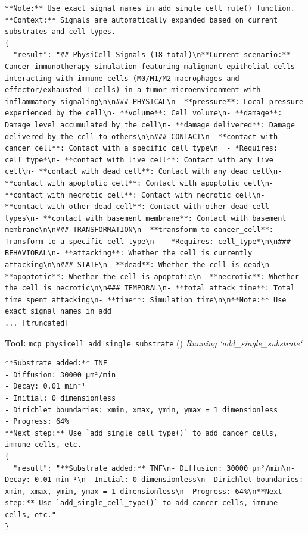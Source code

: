 \documentclass[11pt,a4paper]{article}
\begin{document}
\begin{toolokbox}
\begin{lstlisting}
**Note:** Use exact signal names in add_single_cell_rule() function.
**Context:** Signals are automatically expanded based on current substrates and cell types.
{
  "result": "## PhysiCell Signals (18 total)\n**Current scenario:** Cancer immunotherapy simulation featuring malignant epithelial cells interacting with immune cells (M0/M1/M2 macrophages and effector/exhausted T cells) in a tumor microenvironment with inflammatory signaling\n\n### PHYSICAL\n- **pressure**: Local pressure experienced by the cell\n- **volume**: Cell volume\n- **damage**: Damage level accumulated by the cell\n- **damage delivered**: Damage delivered by the cell to others\n\n### CONTACT\n- **contact with cancer_cell**: Contact with a specific cell type\n  - *Requires: cell_type*\n- **contact with live cell**: Contact with any live cell\n- **contact with dead cell**: Contact with any dead cell\n- **contact with apoptotic cell**: Contact with apoptotic cell\n- **contact with necrotic cell**: Contact with necrotic cell\n- **contact with other dead cell**: Contact with other dead cell types\n- **contact with basement membrane**: Contact with basement membrane\n\n### TRANSFORMATION\n- **transform to cancer_cell**: Transform to a specific cell type\n  - *Requires: cell_type*\n\n### BEHAVIORAL\n- **attacking**: Whether the cell is currently attacking\n\n### STATE\n- **dead**: Whether the cell is dead\n- **apoptotic**: Whether the cell is apoptotic\n- **necrotic**: Whether the cell is necrotic\n\n### TEMPORAL\n- **total attack time**: Total time spent attacking\n- **time**: Simulation time\n\n**Note:** Use exact signal names in add
... [truncated]
\end{lstlisting}
\end{toolokbox}
\begin{toolokbox}
\textbf{Tool:} \texttt{mcp\_physicell\_add\_single\_substrate} (\checkmark)
\textit{Running `add\_single\_substrate`}
\begin{lstlisting}
**Substrate added:** TNF
- Diffusion: 30000 μm²/min
- Decay: 0.01 min⁻¹
- Initial: 0 dimensionless
- Dirichlet boundaries: xmin, xmax, ymin, ymax = 1 dimensionless
- Progress: 64%
**Next step:** Use `add_single_cell_type()` to add cancer cells, immune cells, etc.
{
  "result": "**Substrate added:** TNF\n- Diffusion: 30000 μm²/min\n- Decay: 0.01 min⁻¹\n- Initial: 0 dimensionless\n- Dirichlet boundaries: xmin, xmax, ymin, ymax = 1 dimensionless\n- Progress: 64%\n**Next step:** Use `add_single_cell_type()` to add cancer cells, immune cells, etc."
}
\end{lstlisting}
\end{toolokbox}
\end{document}
